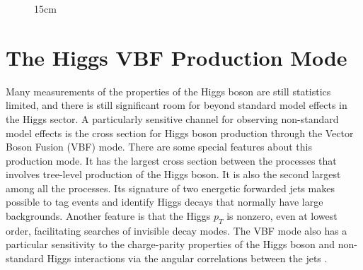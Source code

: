 \begin{figure}[htbp]{15cm}
	\label{fig:Higgs_XSBR}
\end{figure}

\section{The Higgs VBF Production Mode \label{sec:vbf_theory}}
Many measurements of the properties of the Higgs boson are still statistics limited, and there is still significant room for beyond standard model effects in the Higgs sector. A particularly sensitive channel for observing non-standard model effects is the cross section for Higgs boson production through the Vector Boson Fusion (VBF) mode. There are some special features about this production mode. It has the largest cross section between the processes that involves tree-level production of the Higgs boson. It is also the second largest among all the processes. Its signature of two energetic forwarded jets makes possible to tag events and identify Higgs decays that normally have large backgrounds. Another feature is that the Higgs $p_{T}$ is nonzero, even at lowest order, facilitating searches of invisible decay modes. The VBF mode also has a particular sensitivity to the charge-parity properties of the Higgs boson and non-standard Higgs interactions via  the angular correlations between the jets \cite{bib:Dittmaier_et_al_2011,bib:Dittmaier_et_al_2012,bib:Dittmaier_et_al_2013,bib:CMS-PAS-HIG-14-038,bib:ATLAS-CONF-2015-004,bib:PhysRev88-051801-2002}.

